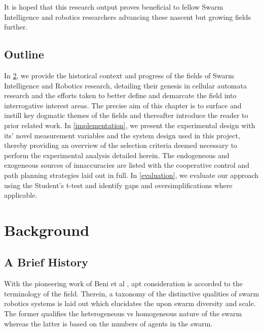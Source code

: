 \documentclass{report}
\begin{document}
It is hoped that this research output proves beneficial to fellow Swarm Intelligence and robotics researchers advancing these nascent but growing fields further.

\section{Outline}

In \ref{background}, we provide the historical context and progress of the fields of Swarm Intelligence and Robotics research, detailing their genesis in cellular automata research and the efforts taken to better define and demarcate the field into interrogative interest areas. The precise aim of this chapter is to surface and instill key dogmatic themes of the fields and thereafter introduce the reader to prior related work.  In \ref{implementation}, we present the experimental design with its' novel measurement variables and the system design used in this project, thereby providing an overview of the selection criteria deemed necessary to perform the experimental analysis detailed herein. The endogeneous and exogeneous sources of innaccuracies are listed with the cooperative control and path planning strategies laid out in full. In \ref{evaluation}, we evaluate our approach using the Student's t-test \cite{Kennedy1995} and identify gaps and oversimplifications where applicable.

\chapter{Background} \label{background}

\section{A Brief History}
With the pioneering work of Beni et al \cite{Beni2005a}, apt consideration is accorded to the terminology of the field. Therein, a taxonomy of the distinctive qualities of swarm robotics systems is laid out which elucidates the upon swarm diversity and scale. The former qualifies the heterogeneous vs homogeneous nature of the swarm whereas the latter is based on the numbers of agents in the swarm.
\end{document}
